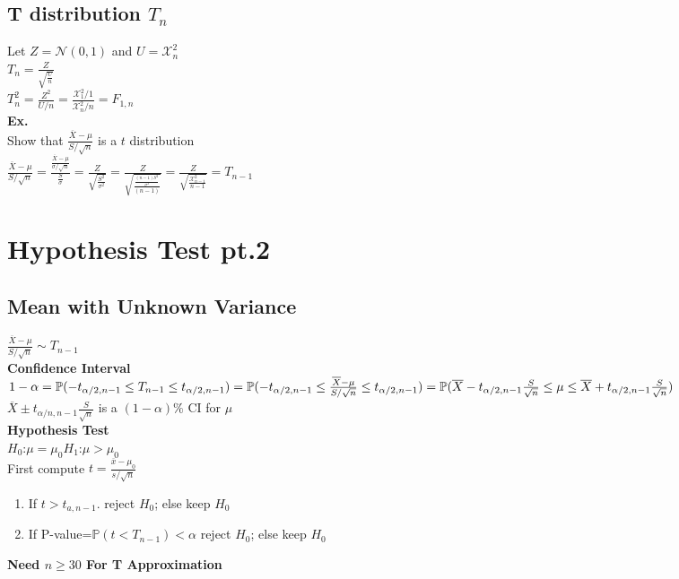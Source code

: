 \documentclass{article}
\begin{document}
\subsection{T distribution $T_n$}
Let $Z=\mathcal{N}(0,1)$ and $U=\mathcal{X}^2_n$\\
$T_n=\frac{Z}{\sqrt{\frac{U}{n}}}$\\
$T^2_n=\frac{Z^2}{U/n}=\frac{\mathcal{X}^2_1/1}{\mathcal{X}^2_n/n}=F_{1,n}$\\
\textbf{Ex.}\\
Show that $\frac{\overline{X}-\mu}{S/\sqrt{n}}$ is a $t$ distribution\\
$\frac{\overline{X}-\mu}{S/\sqrt{n}}=\frac{\frac{\overline{X}-\mu}{\sigma/\sqrt{n}}}{\frac{S}{\sigma}}=\frac{Z}{\sqrt{\frac{S^2}{\sigma^2}}}=\frac{Z}{\sqrt{\frac{\frac{(n-1)S^2}{\sigma^2}}{(n-1)}}}=\frac{Z}{\sqrt{\frac{\mathcal{X}^2_{n-1}}{n-1}}}=T_{n-1}$
\section{Hypothesis Test pt.2}
\label{sec:hypothesis2}
\subsection{Mean with Unknown Variance}
\label{sec:hmeansunknow}
$\frac{\overline{X}-\mu}{S/\sqrt{n}}\sim T_{n-1}$\\
\textbf{Confidence Interval}\\
$1-\alpha=\mathbb{P}(-t_{\alpha/2,n-1}\leq T_{n-1}\leq t_{\alpha/2,n-1})=\mathbb{P}(-t_{\alpha/2,n-1}\leq\frac{\overline{X}-\mu}{S/\sqrt{n}}\leq t_{\alpha/2,n-1})\\=\mathbb{P}(\overline{X}-t_{\alpha/2,n-1}\frac{S}{\sqrt{n}}\leq\mu\leq\overline{X}+t_{\alpha/2,n-1}\frac{S}{\sqrt{n}})$\\
\newline
$\overline{X}\pm t_{\alpha/n,n-1}\frac{S}{\sqrt{n}}$ is a $(1-\alpha)\%$ CI for $\mu$\\
\textbf{Hypothesis Test}\\
$H_0$:$\mu=\mu_0$\hspace*{0.5in}$H_1$:$\mu>\mu_0$\\
First compute $t=\frac{\overline{x}-\mu_0}{s/\sqrt{n}}$
\begin{enumerate}
    \item If $t>t_{a,n-1}$. reject $H_0$; else keep $H_0$
    \item If P-value=$\mathbb{P}(t<T_{n-1})<\alpha$ reject $H_0$; else keep $H_0$
\end{enumerate}
\textbf{Need $n\geq 30$ For T Approximation}
\end{document}
